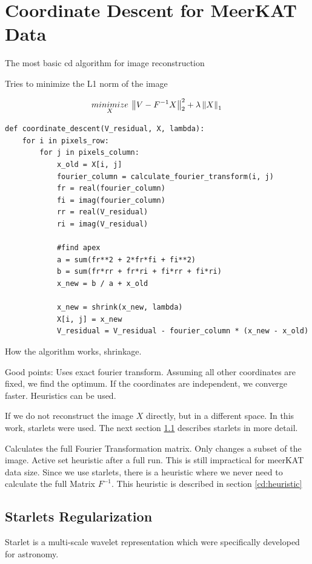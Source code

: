 \section{Coordinate Descent for MeerKAT Data}
The most basic cd algorithm for image reconstruction

Tries to minimize the L1 norm of the image

\begin{equation}
	\underset{X}{minimize} \: \left \| V - F^{-1}X \right \|_2^2 + \lambda \left \| X \right \|_1 \\
\end{equation}

\begin{lstlisting} 
def coordinate_descent(V_residual, X, lambda):
	for i in pixels_row:
		for j in pixels_column:
			x_old = X[i, j]
			fourier_column = calculate_fourier_transform(i, j)
			fr = real(fourier_column)
			fi = imag(fourier_column)
			rr = real(V_residual)
			ri = imag(V_residual)
			
			#find apex
			a = sum(fr**2 + 2*fr*fi + fi**2)
			b = sum(fr*rr + fr*ri + fi*rr + fi*ri)
			x_new = b / a + x_old
			
			x_new = shrink(x_new, lambda)
			X[i, j] = x_new
			V_residual = V_residual - fourier_column * (x_new - x_old)
\end{lstlisting}\label{cd:basic}

How the algorithm works, shrinkage. 

Good points: Uses exact fourier transform. Assuming all other coordinates are fixed, we find the optimum. If the coordinates are independent, we converge faster. Heuristics can be used.

If we do not reconstruct the image $X$ directly, but in a different space. In this work, starlets were used. The next section \ref{cd:starlets} describes starlets in more detail.

Calculates the full Fourier Transformation matrix. Only changes a subset of the image. Active set heuristic after a full run. This is still impractical for meerKAT data size. Since we use starlets, there is a heuristic where we never need to calculate the full Matrix $F^{-1}$. This heuristic is described in section \ref{cd:heuristic}



\subsection{Starlets Regularization} \label{cd:starlets}
Starlet is a multi-scale wavelet representation which were specifically developed for astronomy.

